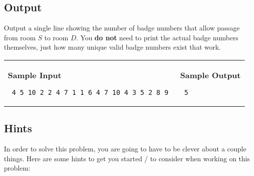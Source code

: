 \documentclass[11pt]{article}
\begin{document}
\subsection*{Output}

Output a single line showing the number of badge numbers that allow passage from room $S$ to room $D$. You \textbf{do not} need to print the actual badge numbers themselves, just how many unique valid badge numbers exist that work.

\vspace{0.25in}\hspace{-0.3in}\begin{tabular}{ll}

\parbox{3in}{{\large\bf Sample Input}

\vspace{0.15in}

{\tt 
4 5 10 2 2 4 7 1 1 6 4 7 10 4 3 5 2 8 9
}
}

&

\parbox{3in}{{\large\bf Sample Output}

\vspace{0.15in}

{\tt
5
}
}

\\

\end{tabular}


\subsection*{Hints}

In order to solve this problem, you are going to have to be clever about a couple things. Here are some hints to get you started / to consider when working on this problem:
\end{document}
